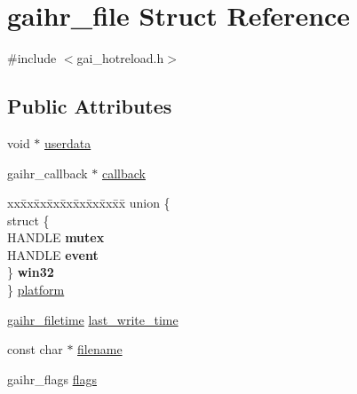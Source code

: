 \hypertarget{structgaihr__file}{}\section{gaihr\+\_\+file Struct Reference}
\label{structgaihr__file}


{\ttfamily \#include $<$gai\+\_\+hotreload.\+h$>$}

\subsection*{Public Attributes}
\begin{DoxyCompactItemize}
\item 
void $\ast$ \hyperlink{structgaihr__file_a06bf963cb9c08e69fcc6c4bb3140a2b8}{userdata}
\item 
gaihr\+\_\+callback $\ast$ \hyperlink{structgaihr__file_a9ac45c0142ff1eaf591b870e163d7f31}{callback}
\item 
\begin{tabbing}
xx\=xx\=xx\=xx\=xx\=xx\=xx\=xx\=xx\=\kill
union \{\\
\mbox{\label{structgaihr__file_a47f5c92e431941d1123bffe57ab5e9ea}} 
\>struct \{\\
\mbox{\label{structgaihr__file_1_1_0D0_1_1_0D1_abd67073f9e6f24b8e2b2f04830dcf26a}} 
HANDLE {\bfseries mutex}\\
\mbox{\label{structgaihr__file_1_1_0D0_1_1_0D1_a2b78d69604475cbeaa4fe29423b29523}} 
HANDLE {\bfseries event}\\
\>\} {\bfseries win32}\\
\} \hyperlink{structgaihr__file_a4fa6fa162b2b39b5c54c260271ad6169}{platform}\\

\end{tabbing}\item 
\hyperlink{structgaihr__filetime}{gaihr\+\_\+filetime} \hyperlink{structgaihr__file_a38b2bc43116a1fd59715ca1714d80462}{last\+\_\+write\+\_\+time}
\item 
const char $\ast$ \hyperlink{structgaihr__file_a26ea2bbf62231c3cae2317ca217f8166}{filename}
\item 
gaihr\+\_\+flags \hyperlink{structgaihr__file_ab6eef82d50a8a51d161de3ab7ad98ee9}{flags}
\end{DoxyCompactItemize}



